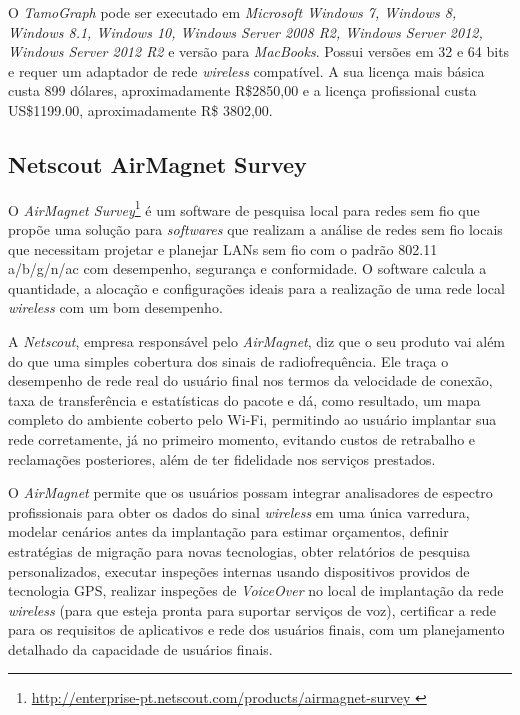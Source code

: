 \documentclass[
	12pt,				%
	openright,			%
	twoside,			%
	a4paper,			%
	english,			%
	french,				%
	spanish,			%
	brazil				%
	]{abntex2}
\begin{document}
O \textit{TamoGraph} pode ser executado em \textit{Microsoft Windows 7, Windows 8, Windows 8.1, Windows 10, Windows Server 2008 R2, Windows Server 2012, Windows Server 2012 R2} e versão para \textit{MacBooks}. Possui versões em 32 e 64 bits e requer um adaptador de rede \textit{wireless} compatível. A sua licença mais básica custa 899 dólares, aproximadamente R\$2850,00 e a licença profissional custa US\$1199.00, aproximadamente R\$ 3802,00.


\subsection[Netscout AirMagnet Survey]{Netscout AirMagnet Survey}

O \textit{AirMagnet Survey}\footnote{\url{http://enterprise-pt.netscout.com/products/airmagnet-survey }} é um software de pesquisa local para redes sem fio que propõe uma solução para \textit{softwares} que realizam a análise de redes sem fio locais que necessitam projetar e planejar LANs sem fio com o padrão 802.11  a/b/g/n/ac com desempenho, segurança e conformidade. O software calcula a quantidade, a alocação e configurações ideais para a realização de uma rede local \textit{wireless} com um bom desempenho.

A \textit{Netscout}, empresa responsável pelo \textit{AirMagnet}, diz que o seu produto vai além do que uma simples cobertura dos sinais de radiofrequência. Ele traça o desempenho de rede real do usuário final nos termos da velocidade de conexão, taxa de transferência e estatísticas do pacote e dá, como resultado, um mapa completo do ambiente coberto pelo Wi-Fi, permitindo ao usuário implantar sua rede corretamente, já no primeiro momento, evitando custos de retrabalho e reclamações posteriores, além de ter fidelidade nos serviços prestados.

O \textit{AirMagnet} permite que os usuários possam integrar analisadores de espectro profissionais para obter os dados do sinal \textit{wireless} em uma única varredura, modelar cenários antes da implantação para estimar orçamentos, definir estratégias de migração para novas tecnologias, obter relatórios de pesquisa personalizados, executar inspeções internas usando dispositivos providos de tecnologia GPS, realizar inspeções de \textit{VoiceOver} no local de implantação da rede \textit{wireless} (para que esteja pronta para suportar serviços de voz), certificar a rede para os requisitos de aplicativos e rede dos usuários finais, com um planejamento detalhado da capacidade de usuários finais.
\end{document}
